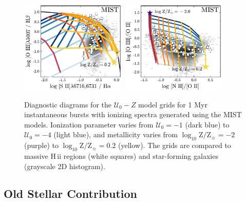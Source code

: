 \documentclass[linenumbers, tighten, trackchanges]{aastex61}%
\newcommand{\logten}{\ensuremath{\log_{10}}}
\newcommand{\hii}{H\,{\sc ii}\xspace}
\newcommand{\logZeq}[1]{\ensuremath{\logten \mathrm{Z}/\mathrm{Z}_{\sun} = #1}}
\newcommand{\U}{\ensuremath{\mathcal{U}_{0}}}
\begin{document}
\begin{figure}[!htbp]
  \begin{centering}
    \includegraphics[width=0.45\textwidth]{f26a.pdf}
    \includegraphics[width=0.45\textwidth]{f26b.pdf}
    \caption{Diagnostic diagrams for the $\U-Z$ model grids for 1 Myr instantaneous bursts with ionizing spectra generated using the MIST models. Ionization parameter varies from $\U=-1$ (dark blue) to $\U=-4$ (light blue), and metallicity varies from \logZeq{-2} (purple) to \logZeq{0.2} (yellow). The grids are compared to massive \hii regions (white squares) and star-forming galaxies (grayscale 2D histogram).}
    \label{fig:MIST:altRatios}
  \end{centering}
\end{figure}



\subsection{Old Stellar Contribution}\label{sec:secondary:old}
\end{document}

